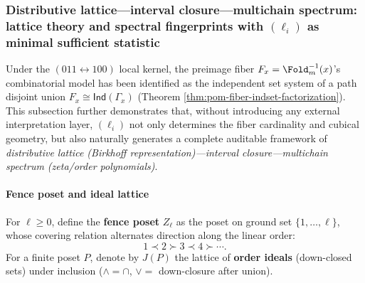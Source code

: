 \subsubsection{Distributive lattice—interval closure—multichain spectrum: lattice theory and spectral fingerprints with \texorpdfstring{\((\ell_i)\)}{(ℓ\_i)} as minimal sufficient statistic}\label{subsubsec:pom-fiber-lattice-fence-interval-zeta}
Under the \((011\leftrightarrow 100)\) local kernel, the preimage fiber \(F_x=\Fold_m^{-1}(x)\)'s combinatorial model has been identified as the independent set system of a path disjoint union
\(
F_x\cong \mathsf{Ind}(\Gamma_x)
\)
(Theorem \ref{thm:pom-fiber-indset-factorization}).
This subsection further demonstrates that, without introducing any external interpretation layer, \((\ell_i)\) not only determines the fiber cardinality and cubical geometry,
but also naturally generates a complete auditable framework of \emph{distributive lattice (Birkhoff representation)—interval closure—multichain spectrum (zeta/order polynomials)}.

\paragraph{Fence poset and ideal lattice}
\begin{definition}\label{def:pom-fence-poset}
For \(\ell\ge 0\), define the \textbf{fence poset} \(Z_\ell\) as the poset on ground set \(\{1,\dots,\ell\}\),
whose covering relation alternates direction along the linear order:
\[
1\prec 2 \succ 3\prec 4 \succ \cdots.
\]
For a finite poset \(P\), denote by \(J(P)\) the lattice of \textbf{order ideals} (down-closed sets) under inclusion (\(\wedge=\cap\), \(\vee=\) down-closure after union).
\end{definition}

